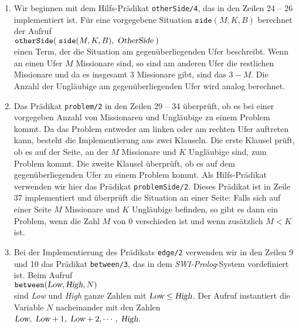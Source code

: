 \begin{enumerate}
\item Wir beginnen mit dem  Hilfs-Prädikat \texttt{otherSide/4}, das in den
      Zeilen 24 -- 26 implementiert ist.  Für eine vorgegebene Situation
      $\texttt{side}(M,K,B)$ berechnet der Aufruf \\[0.1cm]
      \hspace*{1.3cm} $\texttt{otherSide}(\; \texttt{side}(M, K, B),\; \textsl{OtherSide} \;)$
      \\[0.1cm] 
      einen Term, der die Situation am gegenüberliegenden Ufer beschreibt.
      Wenn an einen Ufer $M$ Missionare sind, so sind am anderen Ufer die restlichen
      Missionare und da es insgesamt $3$ Missionare gibt, sind das $3 - M$.
      Die Anzahl der Ungläubige am gegenüberliegenden Ufer wird analog berechnet. 
\item Das Prädikat \texttt{problem/2} in den Zeilen 29 -- 34 überprüft, ob es bei einer vorgegeben
      Anzahl von Missionaren und Ungläubige zu einem Problem kommt.
      Da das Problem entweder am linken oder am rechten Ufer auftreten kann,
      besteht die Implementierung aus zwei Klauseln.  Die erste Klausel prüft,
      ob es auf der Seite, an der $M$ Missionare und $K$ Ungläubige sind, zum Problem
      kommt.  Die zweite Klausel überprüft, ob es auf dem gegenüberliegenden
      Ufer zu einem Problem kommt.  Als Hilfs-Prädikat verwenden wir hier das Prädikat
      \texttt{problemSide/2}.  Dieses Prädikat ist in Zeile 37 implementiert
      und überprüft die Situation an einer Seite:  Falls sich auf einer Seite $M$ Missionare
      und $K$ Ungläubige befinden, so gibt es dann ein Problem, wenn die Zahl $M$ von 0
      verschieden ist und wenn zusätzlich $M < K$ ist.
\item Bei der Implementierung des Prädikats \texttt{edge/2} verwenden wir in den Zeilen 9
      und 10 das Prädikat \texttt{between/3}, das in dem \textsl{SWI-Prolog}-System 
      vordefiniert ist.  Beim Aufruf \\[0.1cm]
      \hspace*{1.3cm} $\texttt{between}(\textsl{Low}, \textsl{High}, N)$ \\[0.1cm]
      sind \textsl{Low} und \textsl{High} ganze Zahlen mit $\textsl{Low} \leq \textsl{High}$.
      Der Aufruf instantiert die Variable $N$ nacheinander mit den Zahlen \\[0.1cm]
      \hspace*{1.3cm} $\textsl{Low},\; \textsl{Low}+1,\; \textsl{Low}+2, \cdots, \;\textsl{High}$. \\[0.1cm]

\end{enumerate}
